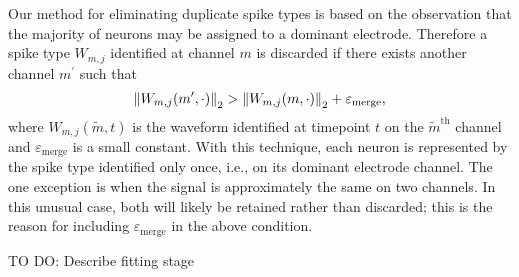 \documentclass[10pt]{article}
\begin{document}
Our method for eliminating duplicate spike types is based on the observation that the majority of neurons may be assigned to a dominant electrode. Therefore a spike type $W_{m,j}$ identified at channel $m$ is discarded if there exists another channel $m^\prime$ such that
$$
\left\lVert W_{m,j}(m^\prime,\cdot)\right\rVert_2>\left\lVert W_{m,j}(m,\cdot)\right\rVert_2+\varepsilon_{\text{merge}},
$$
where $W_{m,j}(\tilde{m},t)$ is the waveform identified at timepoint $t$ on the $\tilde{m}^{\text{th}}$ channel and $\varepsilon_\text{merge}$ is a small constant. With this technique, each neuron is represented by the spike type identified only once, i.e., on its dominant electrode channel. The one exception is when the signal is approximately the same on two channels. In this unusual case, both will likely be retained rather than discarded; this is the reason for including $\varepsilon_\text{merge}$ in the above condition.

TO DO: Describe fitting stage


%

%
\end{document}
